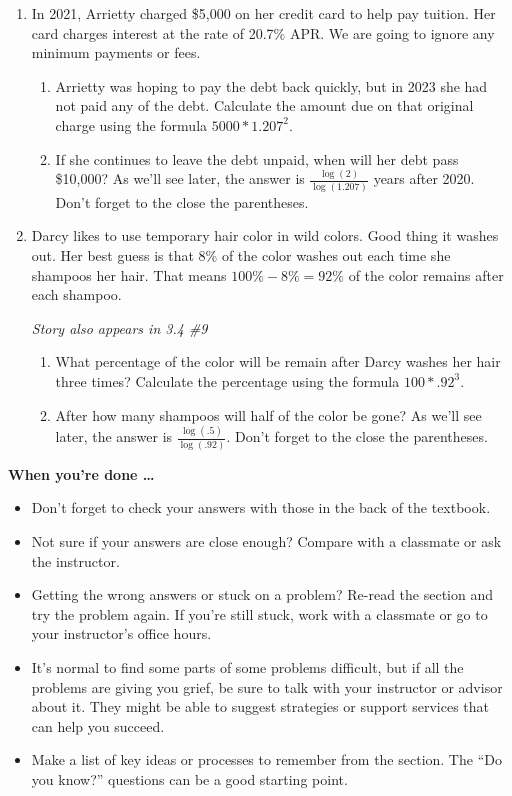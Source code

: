\begin{enumerate}
\item In 2021, Arrietty charged \$5,000 on her credit card to help pay tuition.  Her card charges interest at the rate of 20.7\% APR.   We are going to ignore any minimum payments or fees.
\begin{enumerate}
\item Arrietty was hoping to pay the debt back quickly, but in 2023 she had not paid any of the debt.  Calculate the amount due on that original charge using the formula $5000 \ast 1.207^2$.
\item If she continues to leave the debt unpaid, when will her debt pass \$10,000? As we'll see later, the answer is $\displaystyle \frac{\log(2)}{\log(1.207)}$ years after 2020.  Don't forget to the close the parentheses.  
\end{enumerate}

\item Darcy likes to use temporary hair color in wild colors.  Good thing it washes out.  Her best guess is that 8\% of the color washes out each time she shampoos her hair.   That means $100\% - 8\% = 92\%$ of the color remains after each shampoo.

\hfill \emph{Story also appears in 3.4 \#9}
\begin{enumerate}
\item What percentage of the color will be remain after Darcy washes her hair three times?  Calculate the percentage using the formula $100 \ast .92^3$.  
\item After how many shampoos will half of the color be gone?  As we'll see later, the answer is $\displaystyle \frac{\log(.5)}{\log(.92)}$.  Don't forget to the close the parentheses. 
\end{enumerate}
 

\end{enumerate}

\bigskip

\noindent \textbf{When you're done \ldots}

\begin{itemize}
\item Don't forget to check your answers with those in the back of the textbook. 
\item Not sure if your answers are close enough? Compare with a classmate or ask the instructor.  
\item Getting the wrong answers or stuck on a problem?  Re-read the section and try the problem again.   If you're still stuck, work with a classmate or go to your instructor's office hours.
\item It's normal to find some parts of some problems difficult, but if all the problems are giving you grief, be sure to talk with your instructor or advisor about it.  They might be able to suggest strategies or support services that can help you succeed.
\item Make a list of key ideas or processes to remember from the section.  The ``Do you know?'' questions can be a good starting point.
\end{itemize}

